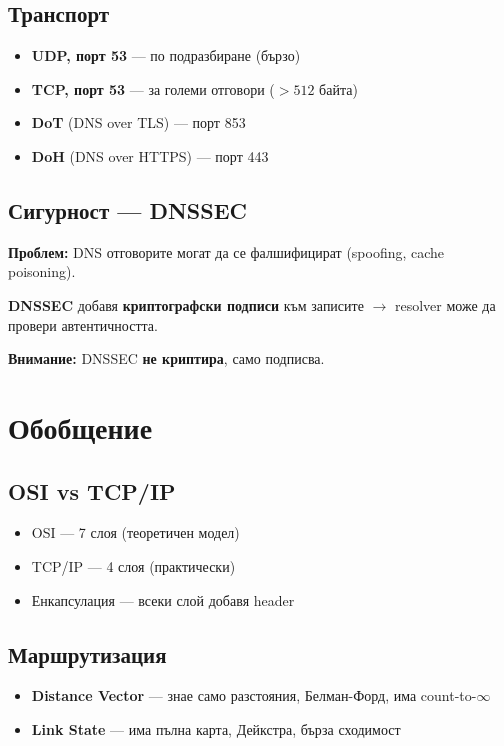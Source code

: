 \documentclass[12pt,a4paper]{article}
\begin{document}
\subsection{Транспорт}

\begin{itemize}
    \item \textbf{UDP, порт 53} — по подразбиране (бързо)
    \item \textbf{TCP, порт 53} — за големи отговори ($>512$ байта)
    \item \textbf{DoT} (DNS over TLS) — порт 853
    \item \textbf{DoH} (DNS over HTTPS) — порт 443
\end{itemize}

\subsection{Сигурност — DNSSEC}

\textbf{Проблем:} DNS отговорите могат да се фалшифицират (spoofing, cache poisoning).

\textbf{DNSSEC} добавя \textbf{криптографски подписи} към записите $\rightarrow$ resolver може да провери автентичността.

\textbf{Внимание:} DNSSEC \textbf{не криптира}, само подписва.

\newpage
\section{Обобщение}

\subsection{OSI vs TCP/IP}
\begin{itemize}
    \item OSI — 7 слоя (теоретичен модел)
    \item TCP/IP — 4 слоя (практически)
    \item Енкапсулация — всеки слой добавя header
\end{itemize}

\subsection{Маршрутизация}
\begin{itemize}
    \item \textbf{Distance Vector} — знае само разстояния, Белман-Форд, има count-to-$\infty$
    \item \textbf{Link State} — има пълна карта, Дейкстра, бърза сходимост
\end{itemize}
\end{document}
